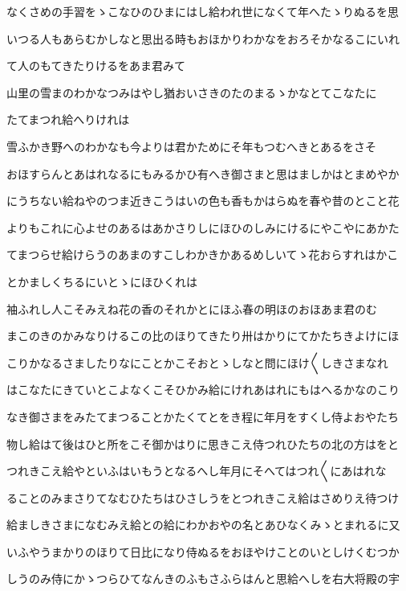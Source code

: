 \documentclass[a4paper,11pt,landscape]{ltjtarticle}
\begin{document}
\par\medskip
なくさめの手習をゝこなひのひまにはし給われ世になくて年へたゝりぬるを思
\par\medskip
いつる人もあらむかしなと思出る時もおほかりわかなをおろそかなるこにいれ
\par\medskip
て人のもてきたりけるをあま君みて
\par\medskip
山里の雪まのわかなつみはやし猶おいさきのたのまるゝかなとてこなたに
\par\medskip
たてまつれ給へりけれは
\par\medskip
雪ふかき野へのわかなも今よりは君かためにそ年もつむへきとあるをさそ
\par\medskip
おほすらんとあはれなるにもみるかひ有へき御さまと思はましかはとまめやか
\par\medskip
にうちない給ねやのつま近きこうはいの色も香もかはらぬを春や昔のとこと花
\par\medskip
よりもこれに心よせのあるはあかさりしにほひのしみにけるにやこやにあかた
\par\medskip
てまつらせ給けらうのあまのすこしわかきかあるめしいてゝ花おらすれはかこ
\par\medskip
とかましくちるにいとゝにほひくれは
\par\medskip
袖ふれし人こそみえね花の香のそれかとにほふ春の明ほのおほあま君のむ
\par\medskip
まこのきのかみなりけるこの比のほりてきたり卅はかりにてかたちきよけにほ
\par\medskip
こりかなるさましたりなにことかこそおとゝしなと問にほけ〱しきさまなれ
\par\medskip
はこなたにきていとこよなくこそひかみ給にけれあはれにもはへるかなのこり
\par\medskip
なき御さまをみたてまつることかたくてとをき程に年月をすくし侍よおやたち
\par\medskip
物し給はて後はひと所をこそ御かはりに思きこえ侍つれひたちの北の方はをと
\par\medskip
つれきこえ給やといふはいもうとなるへし年月にそへてはつれ〱にあはれな
\par\medskip
ることのみまさりてなむひたちはひさしうをとつれきこえ給はさめりえ待つけ
\par\medskip
給ましきさまになむみえ給との給にわかおやの名とあひなくみゝとまれるに又
\par\medskip
いふやうまかりのほりて日比になり侍ぬるをおほやけことのいとしけくむつか
\par\medskip
しうのみ侍にかゝつらひてなんきのふもさふらはんと思給へしを右大将殿の宇
\par\medskip
\end{document}
